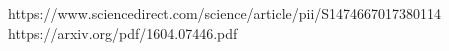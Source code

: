 \newpage
\begin{thebibliography}{99}
     https://www.sciencedirect.com/science/article/pii/S1474667017380114
     https://arxiv.org/pdf/1604.07446.pdf
\end{thebibliography}